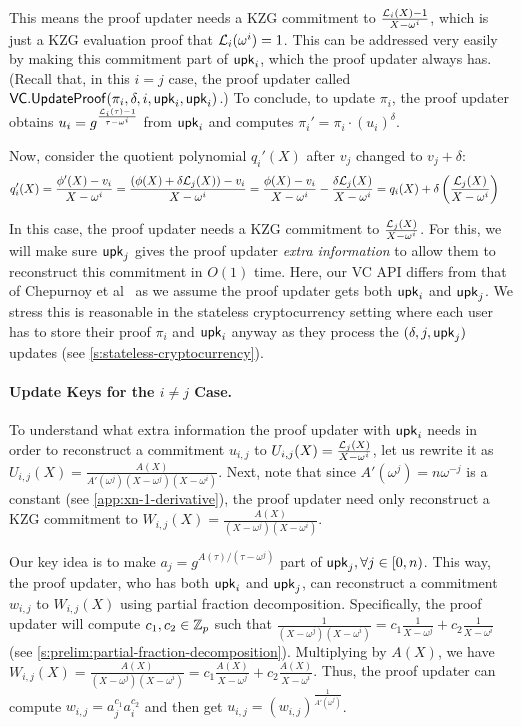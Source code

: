 This means the proof updater needs a KZG commitment to $\frac{\mathcal{L}_i(X)-1}{X-\omega^i}$, which is just a KZG evaluation proof that $\mathcal{L}_i(\omega^i)=1$.
This can be addressed very easily by making this commitment part of $\mathsf{upk}_i$, which the proof updater always has.
(Recall that, in this $i=j$ case, the proof updater called $\mathsf{VC}.\mathsf{UpdateProof}(\pi_i, \delta,i,\mathsf{upk}_i,\mathsf{upk}_i)$.)
To conclude, to update $\pi_i$, the proof updater obtains $u_i=g^{\frac{\mathcal{L}_i(\tau)-1}{\tau - \omega^i}}$ from $\mathsf{upk}_i$ and computes $\pi_i'=\pi_i \cdot \left(u_i\right)^\delta$.

Now, consider the quotient polynomial $q_i'(X)$ after $v_j$ changed to $v_j+\delta$:
\begin{align}
q_i'(X)&=\frac{\phi'(X)-v_i}{X-\omega^i}=\frac{\left(\phi(X) + \delta\mathcal{L}_j(X)\right) - v_i}{X-\omega^i}=\frac{\phi(X) - v_i}{X-\omega^i}-\frac{\delta\mathcal{L}_j(X)}{X-\omega^i} = q_i(X) + \delta\left(\frac{\mathcal{L}_j(X)}{X-\omega^i}\right)
\end{align}

In this case, the proof updater needs a KZG commitment to $\frac{\mathcal{L}_j(X)}{X-\omega^i}$.
For this, we will make sure $\mathsf{upk}_j$ gives the proof updater \textit{extra information} to allow them to reconstruct this commitment in $O(1)$ time.
Here, our VC API differs from that of Chepurnoy et al~\cite{CPZ18} as we assume the proof updater gets both $\mathsf{upk}_i$ and $\mathsf{upk}_j$.
We stress this is reasonable in the stateless cryptocurrency setting where each user has to store their proof $\pi_i$ and $\mathsf{upk}_i$ anyway as they process the $(\delta, j, \mathsf{upk}_j)$ updates (see \cref{s:stateless-cryptocurrency}).

\paragraph{Update Keys for the $i\ne j$ Case.}
To understand what extra information the proof updater with $\mathsf{upk}_i$ needs in order to reconstruct a commitment $u_{i,j}$ to $U_{i,j}(X)=\frac{\mathcal{L}_j(X)}{X-\omega^i}$, let us rewrite it as $U_{i,j}(X)=\frac{A(X)}{A'(\omega^j)(X-\omega^j)(X-\omega^i)}$.
Next, note that since $A'(\omega^j) =n\omega^{-j}$ is a constant (see \cref{app:xn-1-derivative}), the proof updater need only reconstruct a KZG commitment to $W_{i,j}(X)=\frac{A(X)}{(X-\omega^j)(X-\omega^i)}$.

Our key idea is to make $a_j=g^{{A(\tau)}/(\tau-\omega^j)}$ part of $\mathsf{upk}_j,\forall j\in[0,n)$.
This way, the proof updater, who has both $\mathsf{upk}_i$ and $\mathsf{upk}_j$, can reconstruct a commitment $w_{i,j}$ to $W_{i,j}(X)$ using partial fraction decomposition.
Specifically, the proof updater will compute $c_1,c_2\in\mathbb{Z}_p$ such that $\frac{1}{(X-\omega^j)(X-\omega^i)} = c_1 \frac{1}{X-\omega^j} + c_2\frac{1}{X-\omega^i}$ (see \cref{s:prelim:partial-fraction-decomposition}).
Multiplying by $A(X)$, we have $W_{i,j}(X)=\frac{A(X)}{(X-\omega^j)(X-\omega^i)} = c_1 \frac{A(X)}{X-\omega^j} + c_2\frac{A(X)}{X-\omega^i}$.
Thus, the proof updater can compute $w_{i,j} = a_j^{c_1} a_i^{c_2}$ and then get $u_{i,j}=\left(w_{i,j}\right)^{\frac{1}{A'(\omega^j)}}$.

